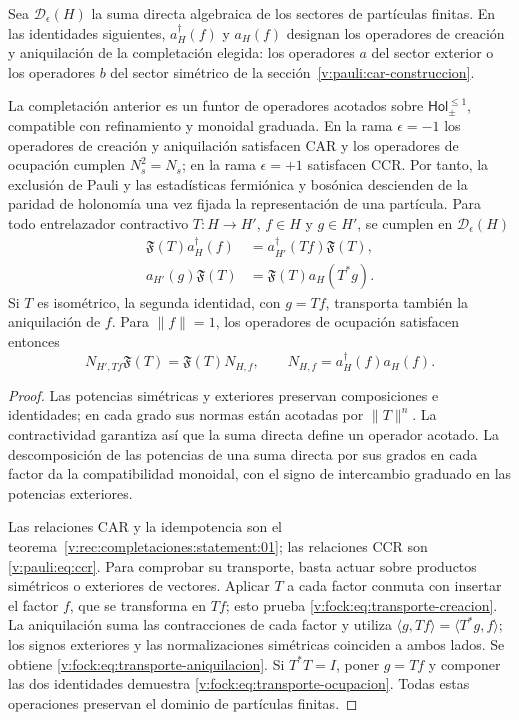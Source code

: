 Sea \(\mathcal D_\epsilon(H)\) la suma directa algebraica de los sectores
de partículas finitas. En las identidades siguientes, \(a_H^\dagger(f)\)
y \(a_H(f)\) designan los operadores de creación y aniquilación de la
completación elegida: los operadores \(a\) del sector exterior o los
operadores \(b\) del sector simétrico de la
sección~\ref{v:pauli:car-construccion}.

\begin{theorem}
\label{v:rec:fock_gibbs:statement:01}
La completación anterior es un funtor de operadores acotados sobre
\(\mathsf{Hol}_{\pm}^{\leq1}\), compatible con refinamiento y
monoidal graduada. En la rama \(\epsilon=-1\) los operadores de creación y
aniquilación satisfacen CAR y los operadores de ocupación cumplen
\(N_s^2=N_s\); en la rama \(\epsilon=+1\) satisfacen CCR. Por tanto, la
exclusión de Pauli y las estadísticas fermiónica y bosónica descienden de la
paridad de holonomía una vez fijada la representación de una partícula.
Para todo entrelazador contractivo \(T:H\to H'\), \(f\in H\) y
\(g\in H'\), se cumplen en \(\mathcal D_\epsilon(H)\)
\begin{align}
 \mathfrak F(T)a_H^\dagger(f)
 &=a_{H'}^\dagger(Tf)\mathfrak F(T),
 \label{v:fock:eq:transporte-creacion}\\
 a_{H'}(g)\mathfrak F(T)
 &=\mathfrak F(T)a_H(T^*g).
 \label{v:fock:eq:transporte-aniquilacion}
\end{align}
Si \(T\) es isométrico, la segunda identidad, con \(g=Tf\), transporta
también la aniquilación de \(f\). Para \(\|f\|=1\), los operadores de
ocupación satisfacen entonces
\begin{equation}
 N_{H',Tf}\mathfrak F(T)=\mathfrak F(T)N_{H,f},
 \qquad N_{H,f}=a_H^\dagger(f)a_H(f).
 \label{v:fock:eq:transporte-ocupacion}
\end{equation}
\end{theorem}

\begin{proof}
Las potencias simétricas y exteriores preservan composiciones e identidades;
en cada grado sus normas están acotadas por \(\|T\|^n\). La contractividad
garantiza así que la suma directa define un operador acotado. La
descomposición de las potencias de una suma directa por sus grados en cada
factor da la compatibilidad monoidal, con el signo de intercambio graduado
en las potencias exteriores.

Las relaciones CAR y la idempotencia son el
teorema~\ref{v:rec:completaciones:statement:01}; las relaciones CCR son
\eqref{v:pauli:eq:ccr}. Para comprobar su transporte, basta actuar sobre
productos simétricos o exteriores de vectores. Aplicar \(T\) a cada factor
conmuta con insertar el factor \(f\), que se transforma en \(Tf\);
esto prueba \eqref{v:fock:eq:transporte-creacion}. La aniquilación suma las
contracciones de cada factor y utiliza
\(\langle g,Tf\rangle=\langle T^*g,f\rangle\); los signos exteriores y
las normalizaciones simétricas coinciden a ambos lados. Se obtiene
\eqref{v:fock:eq:transporte-aniquilacion}. Si \(T^*T=I\), poner \(g=Tf\)
y componer las dos identidades demuestra
\eqref{v:fock:eq:transporte-ocupacion}. Todas estas operaciones preservan
el dominio de partículas finitas.
\end{proof}

